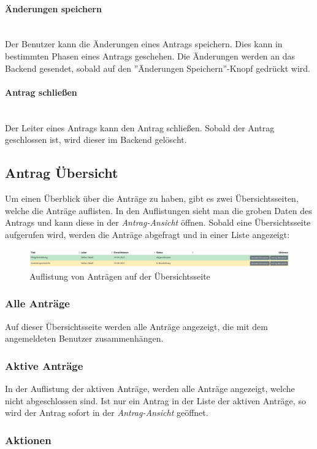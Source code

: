 \paragraph{Änderungen speichern}~\\
Der Benutzer kann die Änderungen eines Antrags speichern. Dies kann in bestimmten Phasen eines Antrags geschehen. Die Änderungen werden an das Backend gesendet, sobald auf den ''Änderungen Speichern''-Knopf gedrückt wird.
\paragraph{Antrag schließen}~\\
Der Leiter eines Antrags kann den Antrag schließen. Sobald der Antrag geschlossen ist, wird dieser im Backend gelöscht.
\subsection{Antrag Übersicht}
\label{sec:antrag_uebersicht}
Um einen Überblick über die Anträge zu haben, gibt es zwei Übersichtsseiten, welche die Anträge auflisten. In den Auflistungen sieht man die groben Daten des Antrags und kann diese in der \textit{Antrag-Ansicht} öffnen. Sobald eine Übersichtsseite aufgerufen wird, werden die Anträge abgefragt und in einer Liste angezeigt:
\begin{figure}[H]
	\centering
	\includegraphics[width=1\linewidth]{images/liste_antrag}
	\caption[Liste der Anträge]{Auflistung von Anträgen auf der Übersichtsseite}
	\label{fig:listeantrag}
\end{figure}

\subsubsection{Alle Anträge}
Auf dieser Übersichtsseite werden alle Anträge angezeigt, die mit dem angemeldeten Benutzer zusammenhängen.
\subsubsection{Aktive Anträge}
In der Auflistung der aktiven Anträge, werden alle Anträge angezeigt, welche nicht abgeschlossen sind. Ist nur ein Antrag in der Liste der aktiven Anträge, so wird der Antrag sofort in der \textit{Antrag-Ansicht} geöffnet.
\subsubsection{Aktionen}

